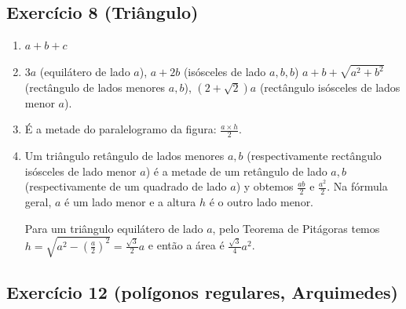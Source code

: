 \subsection*{Exercício 8 (Triângulo)}

\begin{enumerate}
\item $a+b+c$
\item $3a$ (equilátero de lado $a$), $a+2b$ (isósceles de lado $a,b,b$)
  $a+b+\sqrt{a^2+b^2}$ (rectângulo de lados menores $a,b$),
  ${(2+\sqrt{2})}a$ (rectângulo isósceles de lados menor $a$).
\item É a metade do paralelogramo da figura: $\frac{a \times h}{2}$.
\item Um triângulo retângulo de lados menores $a,b$ (respectivamente
  rectângulo isósceles de lado menor $a$) é a metade de um retângulo de lado
  $a,b$ (respectivamente de um quadrado de lado $a$) y obtemos
  $\frac{ab}{2}$ e $\frac{a^2}{2}$. Na fórmula geral, $a$ é um lado menor
  e a altura $h$ é o outro lado menor.

  Para um triângulo equilátero de lado $a$, pelo Teorema de Pitágoras temos
  $h = \sqrt{a^2 - \left(\frac{a}{2}\right)^2} = \frac{\sqrt{3}}{2} a$ e
  então a área é $\frac{\sqrt{3}}{4} a^2$.
  
\end{enumerate}

\subsection*{Exercício 12 (polígonos regulares, Arquimedes)}

